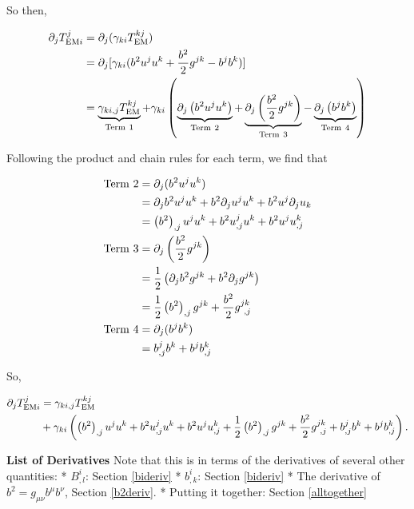 \documentclass[landscape,letterpaper,10pt,english]{article}
\begin{document}
So then,

\begin{align}
\partial_j T^{j}_{{\rm EM} i} &= \partial_j (\gamma_{ki} T^{kj}_{\rm EM}) \\
&= \partial_j [\gamma_{ki} (b^2 u^j u^k + \frac{b^2}{2} g^{jk} - b^j b^k)] \\
&= \underbrace{\gamma_{ki,j} T^{kj}_{\rm EM}}_{\rm Term\ 1} + \gamma_{ki} \left( \underbrace{\partial_j \left(b^2 u^j u^k\right)}_{\rm Term\ 2} + \underbrace{\partial_j \left(\frac{b^2}{2} g^{jk}\right)}_{\rm Term\ 3} - \underbrace{\partial_j \left(b^j b^k\right)}_{\rm Term\ 4} \right) \\
\end{align}

Following the product and chain rules for each term, we find that

\begin{align}
{\rm Term\ 2} &= \partial_j (b^2 u^j u^k) \\
              &= \partial_j b^2 u^j u^k + b^2 \partial_j u^j u^k + b^2 u^j \partial_j u_k \\
              &= \left(b^2\right)_{,j} u^j u^k + b^2 u^j_{,j} u^k + b^2 u^j u^k_{,j} \\
{\rm Term\ 3} &= \partial_j \left(\frac{b^2}{2} g^{jk}\right) \\
              &= \frac{1}{2} \left( \partial_j b^2 g^{jk} + b^2 \partial_j g^{jk} \right) \\
              &= \frac{1}{2} \left(b^2\right)_{,j} g^{jk} + \frac{b^2}{2} g^{jk}_{\ ,j} \\
{\rm Term\ 4} &= \partial_j (b^j b^k) \\
              &= b^j_{,j} b^k + b^j b^k_{,j}\\
\end{align}

So,

\begin{align}
\partial_j T^{j}_{{\rm EM} i} &= \gamma_{ki,j} T^{kj}_{\rm EM} \\
&+ \gamma_{ki} \left(\left(b^2\right)_{,j} u^j u^k +b^2 u^j_{,j} u^k + b^2 u^j u^k_{,j} + \frac{1}{2}\left(b^2\right)_{,j} g^{jk} + \frac{b^2}{2} g^{jk}_{\ ,j} + b^j_{,j} b^k + b^j b^k_{,j}\right).
\end{align}

 \textbf{List of Derivatives} Note that this is in terms of the
derivatives of several other quantities: * \(B^i_{,l}\):
Section \ref{bideriv} * \(b^i_{,k}\): Section \ref{bideriv} * The
derivative of \(b^2 = g_{\mu\nu} b^\mu b^\nu\), Section \ref{b2deriv}. *
Putting it together: Section \ref{alltogether}
\end{document}
